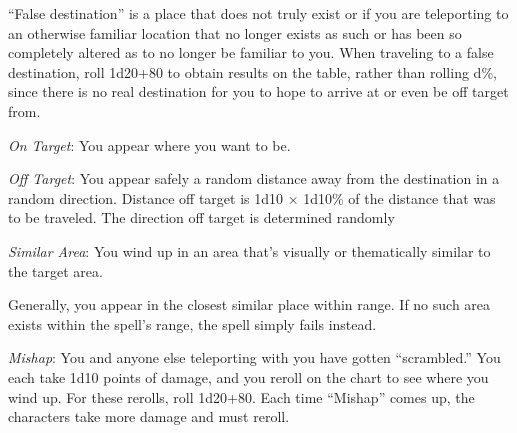 {	``False destination'' is a place that does not truly exist or if you are teleporting to an otherwise familiar location that no longer exists as such or has been so completely altered as to no longer be familiar to you. When traveling to a false destination, roll 1d20+80 to obtain results on the table, rather than rolling d\%, since there is no real destination for you to hope to arrive at or even be off target from.

	\textit{On Target}:
	You appear where you want to be.

	\textit{Off Target}:
	You appear safely a random distance away from the destination in a random direction. Distance off target is 1d10 $\times$ 1d10\% of the distance that was to be traveled. The direction off target is determined randomly

	\textit{Similar Area}:
	You wind up in an area that's visually or thematically similar to the target area.

	Generally, you appear in the closest similar place within range. If no such area exists within the spell's range, the spell simply fails instead.

	\textit{Mishap}:
	You and anyone else teleporting with you have gotten ``scrambled.'' You each take 1d10 points of damage, and you reroll on the chart to see where you wind up. For these rerolls, roll 1d20+80. Each time ``Mishap'' comes up, the characters take more damage and must reroll.


}
